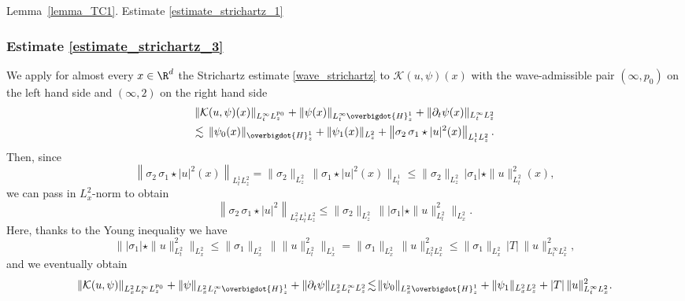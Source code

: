 \begin{ProofOf}{Lemma~\ref{lemma_TC1}. Estimate \eqref{estimate_strichartz_1}}
\subsubsection*{Estimate \eqref{estimate_strichartz_3}} We apply for almost every $x\in\R^{d}$ the Strichartz estimate \eqref{wave_strichartz} to $\mathcal{K}(u,\psi)(x)$ with the wave-admissible pair $(\infty,p_{0})$ on the left hand side and $(\infty,2)$ on the right hand side\vspace*{-3pt}
\begin{multline*}
\|\mathcal{K}(u,\psi)(x)\|_{L_{t}^{\infty}L_{z}^{p_{0}}}+\|\psi(x)\|_{L_{t}^{\infty}\overbigdot{H}_{z}^{1}}+\|\partial_{t}\psi(x)\|_{L_{t}^{\infty}L_{z}^{2}}\\
\lesssim\,\|\psi_{0}(x)\|_{\overbigdot{H}_{z}^{1}}+\|\psi_{1}(x)\|_{L_{z}^{2}}+\left\|\sigma_{2}\,\sigma_{1}\star|u|^{2}(x)\right\|_{L_{t}^{1}L_{z}^{2}}.
\end{multline*}
Then, since\vspace*{-3pt}
\[
\left\|\sigma_{2}\,\sigma_{1}\star|u|^{2}(x)\right\|_{L_{t}^{1}L_{z}^{2}}=\|\sigma_{2}\|_{L_{z}^{2}}\,\|\sigma_{1}\star|u|^{2}(x)\|_{L_{t}^{1}}\leq\|\sigma_{2}\|_{L_{z}^{2}}\,|\sigma_{1}|\star\|u\|_{L_{t}^{2}}^{2}(x),
\]
we can pass in $L_{x}^{2}$-norm to obtain\vspace*{-3pt}
\[
\left\|\sigma_{2}\,\sigma_{1}\star|u|^{2}\right\|_{L_{x}^{2}L_{t}^{1}L_{z}^{2}}\leq\|\sigma_{2}\|_{L_{z}^{2}}\,\bigl\||\sigma_{1}|\star\|u\|_{L_{t}^{2}}^{2}\bigr\|_{L_{x}^{2}}.
\]
Here, thanks to the Young inequality we have
\[
\bigl\||\sigma_{1}|\star\|u\|_{L_{t}^{2}}^{2}\bigr\|_{L_{x}^{2}}\leq \|\sigma_{1}\|_{L_{x}^{2}}\,\bigl\|\|u\|_{L_{t}^{2}}^{2}\bigr\|_{L_{x}^{1}}=\|\sigma_{1}\|_{L_{x}^{2}}\,\|u\|_{L_{t}^{2}L_{x}^{2}}^{2}\leq \|\sigma_{1}\|_{L_{x}^{2}}\,|T|\,\|u\|_{L_{t}^{\infty}L_{x}^{2}}^{2},
\]
and we eventually obtain\vspace*{-3pt}
\[
\|\mathcal{K}(u,\psi)\|_{L_{x}^{2}L_{t}^{\infty}L_{z}^{p_{0}}}+\|\psi\|_{L_{x}^{2}L_{t}^{\infty}\overbigdot{H}_{z}^{1}}+\|\partial_{t}\psi\|_{L_{x}^{2}L_{t}^{\infty}L_{z}^{2}}\!\lesssim\!\|\psi_{0}\|_{L_{x}^{2}\overbigdot{H}_{z}^{1}}+\|\psi_{1}\|_{L_{x}^{2}L_{z}^{2}}+|T|\,\|u\|_{L_{t}^{\infty}L_{x}^{2}}^{2}.
\]


\end{ProofOf}
